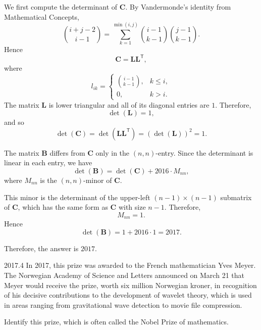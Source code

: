     \begin{solution}
        We first compute the determinant of $\mathbf{C}$. By Vandermonde's identity from
        Mathematical Concepts,
        \[
            \binom{i+j-2}{i-1}
            =
            \sum_{k=1}^{\min(i,j)}
            \binom{i-1}{k-1}
            \binom{j-1}{k-1}.
        \]
        Hence
        \[
            \mathbf{C}=\mathbf{L}\mathbf{L}^{\mathsf T},
        \]
        where
        \[
            l_{ik}
            =
            \begin{cases}
                \binom{i-1}{k-1}, & k\leq i, \\
                0, & k>i.
            \end{cases}
        \]
        The matrix $\mathbf{L}$ is lower triangular and all of its diagonal entries are $1$.
        Therefore,
        \[
            \det(\mathbf{L})=1,
        \]
        and so
        \[
            \det(\mathbf{C})
            =
            \det(\mathbf{L}\mathbf{L}^{\mathsf T})
            =
            (\det(\mathbf{L}))^2
            =
            1.
        \]

        The matrix $\mathbf{B}$ differs from $\mathbf{C}$ only in the $(n,n)$-entry. Since the
        determinant is linear in each entry, we have
        \[
            \det(\mathbf{B})
            =
            \det(\mathbf{C})
            +
            2016\cdot M_{nn},
        \]
        where $M_{nn}$ is the $(n,n)$-minor of $\mathbf{C}$.

        This minor is the determinant of the upper-left $(n-1)\times(n-1)$ submatrix of
        $\mathbf{C}$, which has the same form as $\mathbf{C}$ with size $n-1$. Therefore,
        \[
            M_{nn}=1.
        \]
        Hence
        \[
            \det(\mathbf{B})
            =
            1+2016\cdot 1
            =
            2017.
        \]

        Therefore, the answer is $\boxed{2017}$.
    \end{solution}

    \begin{pastproblem}{2017.4}
        In 2017, this prize was awarded to the French mathematician Yves Meyer. The Norwegian
        Academy of Science and Letters announced on March 21 that Meyer would receive the prize,
        worth six million Norwegian kroner, in recognition of his decisive contributions to the
        development of wavelet theory, which is used in areas ranging from gravitational wave
        detection to movie file compression.

        Identify this prize, which is often called the Nobel Prize of mathematics.
    \end{pastproblem}

